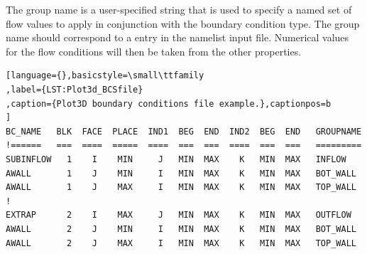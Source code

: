 %
The group name is a user-specified string that is used to specify
a named set of flow values to apply in conjunction with the
boundary condition type.
%
The group name should correspond to a
entry in the namelist input file.
%
Numerical values for the flow conditions will then be taken from
the other  properties.


\begin{center}
\begin{minipage}{0.95\textwidth}
\begin{lstlisting}[language={},basicstyle=\small\ttfamily
,label={LST:Plot3d_BCSfile}
,caption={Plot3D boundary conditions file example.},captionpos=b
]
BC_NAME   BLK  FACE  PLACE  IND1  BEG  END  IND2  BEG  END   GROUPNAME
!======   ===  ====  =====  ====  ===  ===  ====  ===  ===   =========
SUBINFLOW   1    I    MIN     J   MIN  MAX    K   MIN  MAX   INFLOW
AWALL       1    J    MIN     I   MIN  MAX    K   MIN  MAX   BOT_WALL
AWALL       1    J    MAX     I   MIN  MAX    K   MIN  MAX   TOP_WALL
!
EXTRAP      2    I    MAX     J   MIN  MAX    K   MIN  MAX   OUTFLOW
AWALL       2    J    MIN     I   MIN  MAX    K   MIN  MAX   BOT_WALL
AWALL       2    J    MAX     I   MIN  MAX    K   MIN  MAX   TOP_WALL
\end{lstlisting}
\end{minipage}
\end{center}


\vspace{1.0em}%

